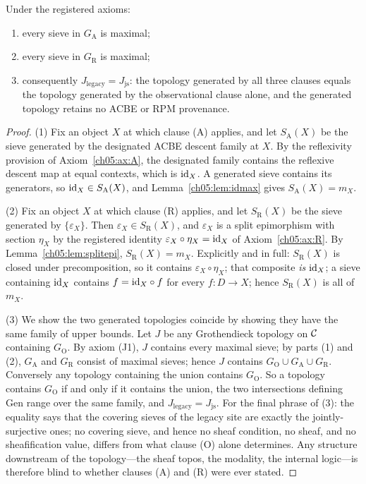 \begin{theorem}\label{ch05:thm:collapse}
Under the registered axioms:
\begin{enumerate}
\item every sieve in $G_{\mathrm{A}}$ is maximal;
\item every sieve in $G_{\mathrm{R}}$ is maximal;
\item consequently
$J_{\mathrm{legacy}}=J_{\mathrm{js}}$: the topology generated by all three
clauses equals the topology generated by the observational clause alone, and
the generated topology retains no ACBE or RPM provenance.
\end{enumerate}
\end{theorem}

\begin{proof}
(1) Fix an object $X$ at which clause (A) applies, and let
$S_{\mathrm{A}}(X)$ be the sieve generated by the designated ACBE descent
family at $X$. By the reflexivity provision of Axiom~\ref{ch05:ax:A}, the
designated family contains the reflexive descent map at equal contexts,
which is $\mathrm{id}_X$. A generated sieve contains its generators, so
$\mathrm{id}_X\in S_{\mathrm{A}}(X)$, and Lemma~\ref{ch05:lem:idmax} gives
$S_{\mathrm{A}}(X)=m_X$.

(2) Fix an object $X$ at which clause (R) applies, and let
$S_{\mathrm{R}}(X)$ be the sieve generated by $\{\varepsilon_X\}$. Then
$\varepsilon_X\in S_{\mathrm{R}}(X)$, and $\varepsilon_X$ is a split
epimorphism with section $\eta_X$ by the registered identity
$\varepsilon_X\circ\eta_X=\mathrm{id}_X$ of Axiom~\ref{ch05:ax:R}. By
Lemma~\ref{ch05:lem:splitepi}, $S_{\mathrm{R}}(X)=m_X$. Explicitly and in
full: $S_{\mathrm{R}}(X)$ is closed under precomposition, so it contains
$\varepsilon_X\circ\eta_X$; that composite \emph{is} $\mathrm{id}_X$; a sieve
containing $\mathrm{id}_X$ contains $f=\mathrm{id}_X\circ f$ for every $f:D\to X$; hence
$S_{\mathrm{R}}(X)$ is all of $m_X$.

(3) We show the two generated topologies coincide by showing they have the
same family of upper bounds. Let $J$ be any Grothendieck topology on $\mathcal{C}$
containing $G_{\mathrm{O}}$. By axiom (J1), $J$ contains every maximal
sieve; by parts (1) and (2), $G_{\mathrm{A}}$ and $G_{\mathrm{R}}$ consist
of maximal sieves; hence $J$ contains
$G_{\mathrm{O}}\cup G_{\mathrm{A}}\cup G_{\mathrm{R}}$. Conversely any
topology containing the union contains $G_{\mathrm{O}}$. So a topology
contains $G_{\mathrm{O}}$ if and only if it contains the union, the two
intersections defining $\mathrm{Gen}$ range over the same family, and
$J_{\mathrm{legacy}}=J_{\mathrm{js}}$. For the final phrase of (3): the
equality says that the covering sieves of the legacy site are exactly the
jointly-surjective ones; no covering sieve, and hence no sheaf condition, no
sheaf, and no sheafification value, differs from what clause (O) alone
determines. Any structure downstream of the topology---the sheaf topos, the
modality, the internal logic---is therefore blind to whether clauses (A) and
(R) were ever stated.
\end{proof}


